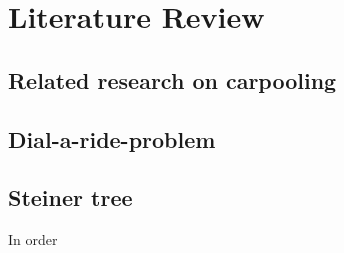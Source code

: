 
\chapter{Literature Review}

\section{Related research on carpooling}

\section{Dial-a-ride-problem}

\section{Steiner tree}

In order
